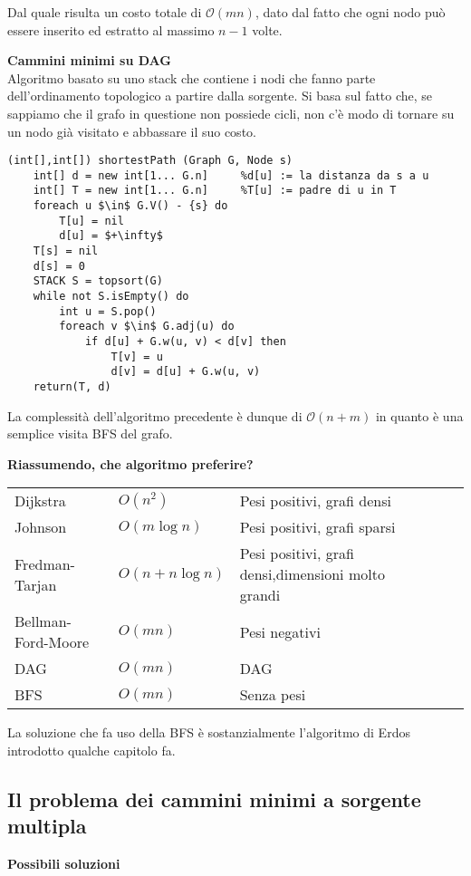 \documentclass[../cheatSheetAlgoritmi.tex]{subfiles}
\begin{document}
\bigskip
Dal quale risulta un costo totale di $\mathcal{O}(mn)$, dato dal fatto che ogni nodo può essere inserito ed estratto al massimo $n-1$ volte.

\newpage
\textbf{Cammini minimi su DAG} \\
Algoritmo basato su uno stack che contiene i nodi che fanno parte dell'ordinamento topologico a partire dalla sorgente. Si basa sul fatto che, se sappiamo che il grafo in questione non possiede cicli, non c'è modo di tornare su un nodo già visitato e abbassare il suo costo.
\begin{lstlisting}[caption=Algoritmo per i DAG: cammini minimi a sorgente singola]
(int[],int[]) shortestPath (Graph G, Node s)
	int[] d = new int[1... G.n]		%d[u] := la distanza da s a u 
	int[] T = new int[1... G.n]		%T[u] := padre di u in T
	foreach u $\in$ G.V() - {s} do
		T[u] = nil
		d[u] = $+\infty$
	T[s] = nil
	d[s] = 0
	STACK S = topsort(G)
	while not S.isEmpty() do 
		int u = S.pop()
		foreach v $\in$ G.adj(u) do
			if d[u] + G.w(u, v) < d[v] then 
				T[v] = u 
				d[v] = d[u] + G.w(u, v)
	return(T, d)
\end{lstlisting}
La complessità dell'algoritmo precedente è dunque di $\mathcal{O}(n + m)$ in quanto è una semplice visita BFS del grafo.

\bigskip
\textbf{Riassumendo, che algoritmo preferire?}

\bigskip
\begin{tabular}{lllll}
Dijkstra       &  $O(n^2)$ & Pesi positivi, grafi densi &  \\
Johnson        &  $O(m \log n)$ &  Pesi positivi, grafi sparsi &  \\
Fredman-Tarjan &  $O(n + n \log n)$ & Pesi positivi, grafi densi,dimensioni molto grandi  & \\
Bellman-Ford-Moore &  $O(mn)$ & Pesi negativi &  \\
DAG               & $O(mn)$ & DAG  &  \\
BFS	 & $O(mn)$ & Senza pesi &  \\
\end{tabular}

\bigskip
La soluzione che fa uso della BFS è sostanzialmente l'algoritmo di Erdos introdotto qualche capitolo fa.

\subsection{Il problema dei cammini minimi a sorgente multipla}
\textbf{Possibili soluzioni}
\end{document}

